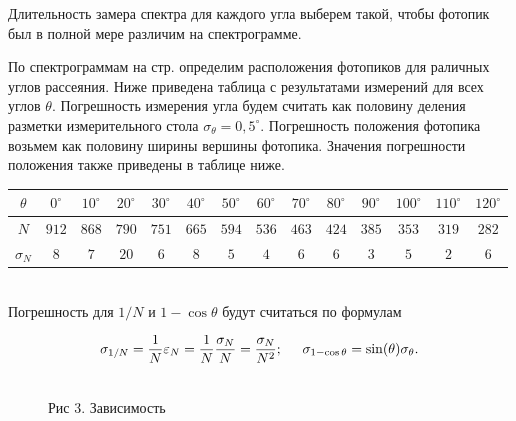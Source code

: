 \documentclass[12pt]{article}
\begin{document}
    Длительность замера спектра для каждого угла выберем такой, чтобы фотопик
    был в полной мере различим на спектрограмме.

    По спектрограммам на стр. \pageref{add:spectres} определим расположения
    фотопиков для раличных углов рассеяния.
    Ниже приведена таблица с результатами измерений для всех углов $\theta$.
    Погрешность измерения угла будем считать как половину деления разметки
    измерительного стола $\sigma_{\theta} = 0,5^{\circ}$.
    Погрешность положения фотопика возьмем как половину ширины вершины фотопика.
    Значения погрешности положения также приведены в таблице ниже.\\

    \begin{tabular}{|c||c|c|c|c|c|c|c|c|c|c|c|c|c|}
      \hline
      $\theta$ & $0^{\circ}$ & $10^{\circ}$ & $20^{\circ}$ & $30^{\circ}$ &
      $40^{\circ}$ & $50^{\circ}$ & $60^{\circ}$ & $70^{\circ}$ & $80^{\circ}$ &
      $90^{\circ}$ & $100^{\circ}$ & $110^{\circ}$ & $120^{\circ}$ \\ \hline
      $N$ & $912$ & $868$ & $790$ & $751$ & $665$ & $594$ & $536$ & $463$ &
      $424$ & $385$ & $353$ & $319$ & $282$ \\ \hline
      $\sigma_N$ & $8$ & $7$ & $20$ & $6$ & $8$ & $5$ & $4$ & $6$ & $6$ & $3$ &
      $5$ & $2$ & $6$ \\
      \hline
    \end{tabular}\\

    Погрешность для $1/N$ и $1 - \cos\theta$ будут считаться по формулам

    $$
      \sigma_{1/N} = \frac{1}{N} \varepsilon_N = \frac{1}{N} \frac{\sigma_N}{N}
      = \frac{\sigma_N}{N^2}; \hspace{0.5cm}
      \sigma_{1 - \cos\theta} = \sin(\theta) \sigma_{\theta}.
    $$

    \begin{figure}[h!]
      \\
      Рис 3. Зависимость
      \label{fig:plot}
    \end{figure}
\end{document}
